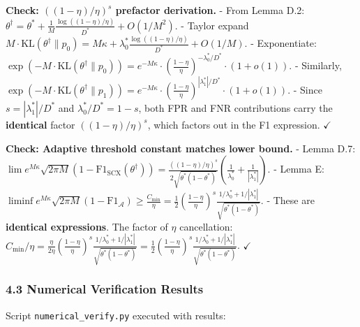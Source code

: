 \documentclass[
  12pt,
]{ctexart}
\begin{document}
\textbf{Check: \(((1-\eta)/\eta)^s\) prefactor derivation.} - From Lemma
D.2:
\(\theta^\dagger = \theta^* + \frac{1}{M}\frac{\log((1-\eta)/\eta)}{D^*} + O(1/M^2)\).
- Taylor expand
\(M\cdot\text{KL}(\theta^\dagger\|p_0) = M\kappa + \lambda_0^*\frac{\log((1-\eta)/\eta)}{D^*} + O(1/M)\).
- Exponentiate:
\(\exp(-M\cdot\text{KL}(\theta^\dagger\|p_0)) = e^{-M\kappa} \cdot \left(\frac{1-\eta}{\eta}\right)^{-\lambda_0^*/D^*} \cdot (1+o(1))\).
- Similarly,
\(\exp(-M\cdot\text{KL}(\theta^\dagger\|p_1)) = e^{-M\kappa} \cdot \left(\frac{1-\eta}{\eta}\right)^{|\lambda_1^*|/D^*} \cdot (1+o(1))\).
- Since \(s = |\lambda_1^*|/D^*\) and \(\lambda_0^*/D^* = 1-s\), both
FPR and FNR contributions carry the \textbf{identical} factor
\(((1-\eta)/\eta)^s\), which factors out in the F1 expression.
\(\checkmark\)

\textbf{Check: Adaptive threshold constant matches lower bound.} - Lemma
D.7:
\(\lim e^{M\kappa}\sqrt{2\pi M}(1-\text{F1}_{\text{SCX}}(\theta^\dagger)) = \frac{((1-\eta)/\eta)^s}{2\sqrt{\theta^*(1-\theta^*)}}\left(\frac{1}{\lambda_0^*} + \frac{1}{|\lambda_1^*|}\right)\).
- Lemma E:
\(\liminf e^{M\kappa}\sqrt{2\pi M}(1-\text{F1}_{\mathcal{A}}) \geq \frac{C_{\min}}{\eta} = \frac{1}{2}\left(\frac{1-\eta}{\eta}\right)^s \frac{1/\lambda_0^* + 1/|\lambda_1^*|}{\sqrt{\theta^*(1-\theta^*)}}\).
- These are \textbf{identical expressions}. The factor of \(\eta\)
cancellation:
\(C_{\min}/\eta = \frac{\eta}{2\eta}(\frac{1-\eta}{\eta})^s \frac{1/\lambda_0^*+1/|\lambda_1^*|}{\sqrt{\theta^*(1-\theta^*)}} = \frac{1}{2}(\frac{1-\eta}{\eta})^s \frac{1/\lambda_0^*+1/|\lambda_1^*|}{\sqrt{\theta^*(1-\theta^*)}}\).
\(\checkmark\)

\subsubsection{4.3 Numerical Verification
Results}\label{numerical-verification-results}

Script \texttt{numerical\_verify.py} executed with results:
\end{document}
